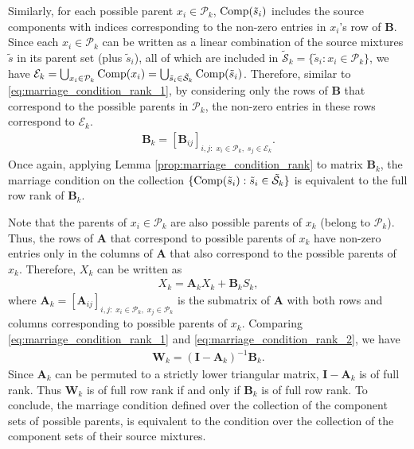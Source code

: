 \documentclass[12pt]{article}
\newcommand{\setS}{\mathcal{S}}
\newcommand{\bA}{\mathbf{A}}
\newcommand{\bB}{\mathbf{B}}
\newcommand{\bW}{\mathbf{W}}
\newcommand{\bI}{\mathbf{I}}
\begin{document}
Similarly, for each possible parent $x_i\in \mathcal{P}_k$, ${\rm{Comp}}(\tilde{s}_i)$ includes the source components with indices corresponding to the non-zero entries in $x_i$'s row of $\bB$. Since each $x_i\in\mathcal{P}_k$ can be written as a linear combination of the source mixtures $\tilde{s}$ in its parent set (plus $\tilde{s}_i$), all of which are included in $\tilde{\setS}_k=\{\tilde{s}_i: x_i\in\mathcal{P}_k\}$, we have $\mathcal{E}_k=\bigcup_{x_i\in \mathcal{P}_k}{\rm{Comp}}(x_i) =\bigcup_{\tilde{s}_i\in \tilde{\setS}_k}{\rm{Comp}}(\tilde{s}_i)$. Therefore, similar to \eqref{eq:marriage_condition_rank_1}, by considering only the rows of $\bB$ that correspond to the possible parents in $\mathcal{P}_k$, the non-zero entries in these rows correspond to $\mathcal{E}_k$.
\begin{align}
    \bB_k = \left[\bB_{ij}\right]_{i,j:\; x_i\in \mathcal{P}_k,\;s_j\in \mathcal{E}_k}.
\end{align}
Once again, applying Lemma \ref{prop:marriage_condition_rank} to matrix $\bB_k$, the marriage condition on the collection $\{{\rm{Comp}}(\tilde{s}_i):\tilde{s}_i\in \tilde{\setS}_k\}$ is equivalent to the full row rank of $\bB_k$.

Note that the parents of $x_i\in\mathcal{P}_k$ are also possible parents of $x_k$ (belong to $\mathcal{P}_k$). Thus, the rows of $\bA$ that correspond to possible parents of $x_k$ have non-zero entries only in the columns of $\bA$ that also correspond to the possible parents of $x_k$. Therefore, $X_k$ can be written as
\begin{align}
X_k = \bA_k X_k + \bB_k S_k,
\label{eq:marriage_condition_rank_2}
\end{align}
where $\bA_k = \left[\bA_{ij}\right]_{i,j:\;x_i\in \mathcal{P}_k,\;x_j\in \mathcal{P}_k}$ is the submatrix of $\bA$ with both rows and columns corresponding to possible parents of $x_k$. Comparing \eqref{eq:marriage_condition_rank_1} and \eqref{eq:marriage_condition_rank_2}, we have
\begin{align}
\bW_k = (\bI - \bA_k)^{-1} \bB_k.
\label{eq:marriage_condition_rank_3}
\end{align}
Since $\bA_k$ can be permuted to a strictly lower triangular matrix, $\bI - \bA_k$ is of full rank. Thus $\bW_k$ is of full row rank if and only if $\bB_k$ is of full row rank. To conclude, the marriage condition defined over the collection of the component sets of possible parents, is equivalent to the condition over the collection of the component sets of their source mixtures.
\end{document}
